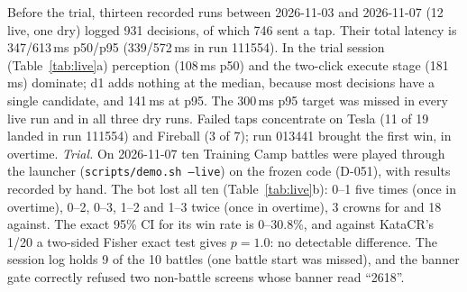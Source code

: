 \documentclass[conference]{IEEEtran}
\newcommand{\tw}[1]{\texttt{#1}}
\begin{document}
Before the trial, thirteen recorded runs between 2026-11-03 and 2026-11-07 (12 live, one dry) logged 931 decisions, of which 746 sent a tap. Their total latency is 347/613\,ms p50/p95 (339/572\,ms in run 111554). In the trial session (Table~\ref{tab:live}a) perception (108\,ms p50) and the two-click execute stage (181\,ms) dominate; d1 adds nothing at the median, because most decisions have a single candidate, and 141\,ms at p95. The 300\,ms p95 target was missed in every live run and in all three dry runs. Failed taps concentrate on Tesla (11 of 19 landed in run 111554) and Fireball (3 of 7); run 013441 brought the first win, in overtime. %
\emph{Trial.} On 2026-11-07 ten Training Camp battles were played through the launcher (\tw{scripts/demo.sh --live}) on the frozen code (D-051), with results recorded by hand. The bot lost all ten (Table~\ref{tab:live}b): 0--1 five times (once in overtime), 0--2, 0--3, 1--2 and 1--3 twice (once in overtime), 3 crowns for and 18 against. The exact 95\% CI for its win rate is 0--30.8\%, and against KataCR's 1/20 a two-sided Fisher exact test gives $p=1.0$: no detectable difference. The session log holds 9 of the 10 battles (one battle start was missed), and the banner gate correctly refused two non-battle screens whose banner read ``2618''. %
\end{document}
